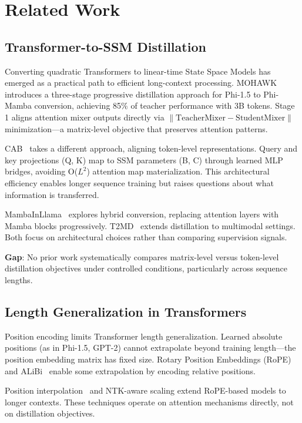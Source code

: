 \section{Related Work}

\subsection{Transformer-to-SSM Distillation}

Converting quadratic Transformers to linear-time State Space Models has emerged as a practical path to efficient long-context processing. MOHAWK~\cite{bick2024mohawk} introduces a three-stage progressive distillation approach for Phi-1.5 to Phi-Mamba conversion, achieving 85\% of teacher performance with 3B tokens. Stage 1 aligns attention mixer outputs directly via $\|\text{TeacherMixer} - \text{StudentMixer}\|$ minimization---a matrix-level objective that preserves attention patterns.

CAB~\cite{wang2025cab} takes a different approach, aligning token-level representations. Query and key projections (Q, K) map to SSM parameters (B, C) through learned MLP bridges, avoiding O($L^2$) attention map materialization. This architectural efficiency enables longer sequence training but raises questions about what information is transferred.

MambaInLlama~\cite{wang2024mammainllama} explores hybrid conversion, replacing attention layers with Mamba blocks progressively. T2MD~\cite{zhang2024t2md} extends distillation to multimodal settings. Both focus on architectural choices rather than comparing supervision signals.

\textbf{Gap}: No prior work systematically compares matrix-level versus token-level distillation objectives under controlled conditions, particularly across sequence lengths.

\subsection{Length Generalization in Transformers}

Position encoding limits Transformer length generalization. Learned absolute positions (as in Phi-1.5, GPT-2) cannot extrapolate beyond training length---the position embedding matrix has fixed size. Rotary Position Embeddings (RoPE)~\cite{su2021roformer} and ALiBi~\cite{press2021alibi} enable some extrapolation by encoding relative positions.

Position interpolation~\cite{chen2023extending} and NTK-aware scaling extend RoPE-based models to longer contexts. These techniques operate on attention mechanisms directly, not on distillation objectives.

